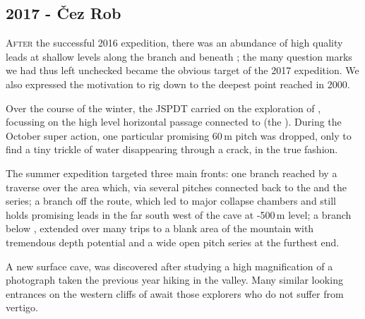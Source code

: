 \newpage
  
\begin{tcolorbox}

\chapter{2017 - Čez Rob}
	
	\lettrine{A}{fter} the successful 2016 expedition, there was an abundance of high quality leads at shallow levels along the  branch and beneath ; the many question marks we had thus left unchecked became the obvious target of the 2017 expedition. We also expressed the motivation to rig down to the deepest point reached in 2000.

	Over the course of the winter, the JSPDT carried on the exploration of , focussing on the high level horizontal passage connected to  (the ). During the October super action, one particular promising 60\,m pitch was dropped, only to find a tiny trickle of water disappearing through a crack, in the true  fashion.

	The summer expedition targeted three main fronts: one branch reached by a traverse over the  area which, via several pitches connected back to the  and the  series; a branch off the  route, which led to major collapse chambers and still holds promising leads in the far south west of the cave at -500\,m level; a branch below , extended over many trips to a blank area of the mountain with tremendous depth potential and a wide open pitch series at the furthest end.

	A new surface cave,  was discovered after studying a high magnification of a photograph taken the previous year hiking in the  valley. Many similar looking entrances on the western cliffs of  await those explorers who do not suffer from vertigo.

\end{tcolorbox}

